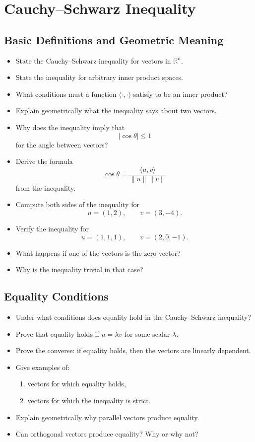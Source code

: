 \section{Cauchy–Schwarz Inequality}

\subsection{Basic Definitions and Geometric Meaning}

\begin{itemize}
  \item State the Cauchy--Schwarz inequality for vectors in $\mathbb{R}^n$.
  \item State the inequality for arbitrary inner product spaces.
  \item What conditions must a function $\langle \cdot,\cdot\rangle$ satisfy to be an inner product?
  \item Explain geometrically what the inequality says about two vectors.
  \item Why does the inequality imply that
    \[
      |\cos\theta| \le 1
    \]
    for the angle between vectors?
  \item Derive the formula
    \[
      \cos\theta = \frac{\langle u,v\rangle}{\|u\|\|v\|}
    \]
    from the inequality.
  \item Compute both sides of the inequality for
    \[
      u=(1,2), \qquad v=(3,-4).
    \]
  \item Verify the inequality for
    \[
      u=(1,1,1), \qquad v=(2,0,-1).
    \]
  \item What happens if one of the vectors is the zero vector?
  \item Why is the inequality trivial in that case?
\end{itemize}

\subsection{Equality Conditions}

\begin{itemize}[resume]
  \item Under what conditions does equality hold in the Cauchy--Schwarz inequality?
  \item Prove that equality holds if $u=\lambda v$ for some scalar $\lambda$.
  \item Prove the converse: if equality holds, then the vectors are linearly dependent.
  \item Give examples of:
    \begin{enumerate}
      \item vectors for which equality holds,
      \item vectors for which the inequality is strict.
    \end{enumerate}
  \item Explain geometrically why parallel vectors produce equality.
  \item Can orthogonal vectors produce equality? Why or why not?
\end{itemize}

